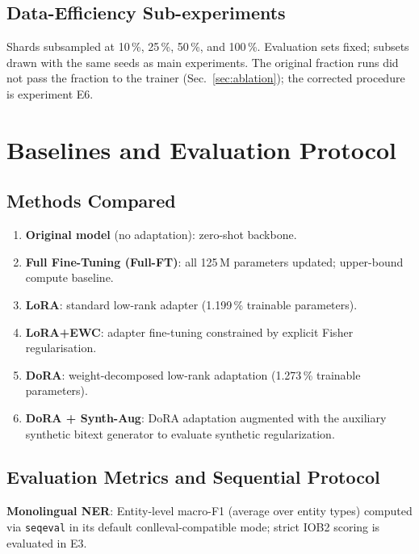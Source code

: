 \documentclass[11pt,a4paper]{article}
\begin{document}
\subsection{Data-Efficiency Sub-experiments}
\label{sec:dataeff}

Shards subsampled at 10\,\%, 25\,\%, 50\,\%, and 100\,\%.  Evaluation
sets fixed; subsets drawn with the same seeds as main experiments.
The original fraction runs did not pass the fraction to the trainer
(Sec.~\ref{sec:ablation}); the corrected procedure is experiment E6.

\section{Baselines and Evaluation Protocol}
\label{sec:evalprotocol}

\subsection{Methods Compared}

\begin{enumerate}
  \item \textbf{Original model} (no adaptation): zero-shot backbone.
  \item \textbf{Full Fine-Tuning (Full-FT)}: all 125\,M parameters
        updated; upper-bound compute baseline.
  \item \textbf{LoRA}: standard low-rank adapter (1.199\,\% trainable parameters).
  \item \textbf{LoRA+EWC}: adapter fine-tuning constrained by explicit Fisher regularisation.
  \item \textbf{DoRA}: weight-decomposed low-rank adaptation (1.273\,\% trainable parameters).
  \item \textbf{DoRA + Synth-Aug}: DoRA adaptation augmented with the auxiliary synthetic bitext generator to evaluate synthetic regularization.
\end{enumerate}

\subsection{Evaluation Metrics and Sequential Protocol}

\textbf{Monolingual NER}: Entity-level macro-F1 (average over entity types)
computed via \texttt{seqeval} in its default conlleval-compatible mode;
strict IOB2 scoring is evaluated in E3.
\end{document}

